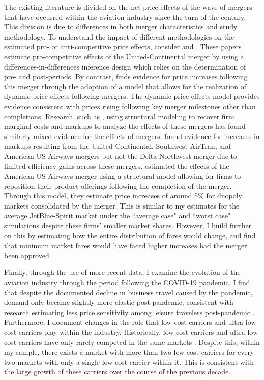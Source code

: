 \documentclass{article}
\begin{document}
    The existing literature is divided on the net price effects of the wave of mergers that have occurred within the aviation industry since the turn of the century. This division is due to differences in both merger characteristics and study methodology. To understand the impact of different methodologies on the estimated pro- or anti-competitive price effects, consider \citet{luo_price_2014} and \citet{carlton_are_2019}. These papers estimate pro-competitive effects of the United-Continental merger by using a differences-in-differences inference design which relies on the determination of pre- and post-periods. By contrast, \citet{fan_when_2020} finds evidence for price increases following this merger through the adoption of a model that allows for the realization of dynamic price effects following mergers. The dynamic price effects model provides evidence consistent with prices rising following key merger milestones other than completions. Research, such as \citet{bet_retrospective_2021, ciliberto_market_2021}, using structural modeling to recover firm marginal costs and markups to analyze the effects of these mergers has found similarly mixed evidence for the effects of mergers. \citet{bet_retrospective_2021} found evidence for increases in markups resulting from the United-Continental, Southwest-AirTran, and American-US Airways mergers but not the Delta-Northwest merger due to limited efficiency gains across these mergers. \citet{ciliberto_market_2021} estimated the effects of the American-US Airways merger using a structural model allowing for firms to reposition their product offerings following the completion of the merger. Through this model, they estimate price increases of around 5\% for duopoly markets consolidated by the merger. This is similar to my estimates for the average JetBlue-Spirit market under the ``average case" and ``worst case" simulations despite these firms' smaller market shares. However, I build further on this by estimating how the entire distribution of fares would change, and find that minimum market fares would have faced higher increases had the merger been approved. %


    Finally, through the use of more recent data, I examine the evolution of the aviation industry through the period following the COVID-19 pandemic. I find that despite the documented decline in business travel caused by the pandemic, demand only became slightly more elastic post-pandemic, consistent with research estimating less price sensitivity among leisure travelers post-pandemic \citep{ewen_zoom_2023}. Furthermore, I document changes in the role that low-cost carriers and ultra-low cost carriers play within the industry. Historically, low-cost carriers and ultra-low cost carriers have only rarely competed in the same markets \citep{ciliberto_market_2021}. Despite this, within my sample, there exists a market with more than two low-cost carriers for every two markets with only a single low-cost carrier within it. This is consistent with the large growth of these carriers over the course of the previous decade.
    
\end{document}
